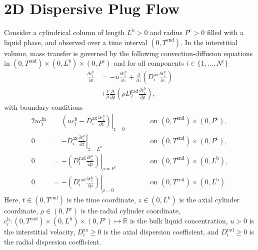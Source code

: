 \documentclass{article}
\begin{document}
\section*{2D Dispersive Plug Flow}
Consider a cylindrical column of length $L^{\mathrm{b}} > 0$ and radius $P^{\mathrm{c}} > 0$ filled with a liquid phase, and observed over a time interval $(0, T^{\mathrm{end}})$.
In the interstitial volume, mass transfer is governed by the following convection-diffusion equations in $(0, T^{\mathrm{end}})\times (0, L^{\mathrm{b}})\times (0, P^{\mathrm{c}})$ and for all components $i\in\{1, \dots, N^{\mathrm{c}} \}$
\begin{align}
    \frac{\partial c^{\mathrm{b}}_{i}}{\partial t}
    &= - u \frac{\partial c^{\mathrm{b}}_{i}}{\partial z}
        + \frac{\partial}{\partial z} \left( D^{\mathrm{ax}}_{i} \frac{\partial c^{\mathrm{b}}_{i}}{\partial z} \right) \nonumber
    \\
    &+ \frac{1}{\rho} \frac{\partial}{\partial \rho} \left( \rho D^{\mathrm{rad}}_{i} \frac{\partial c^{\mathrm{b}}_{i}}{\partial \rho} \right),
\end{align}
with boundary conditions
\begin{alignat}{2}
    u c^{\mathrm{in}}_{i}
    &= \left.\left( u c^{\mathrm{b}}_{i} - D^{\mathrm{ax}}_{i} \frac{\partial c^{\mathrm{b}}_{i}}{\partial z}\right)\right|_{z=0}
    & & \qquad\text{on }(0, T^{\mathrm{end}})\times (0, P^{\mathrm{c}}),
    \\
    0
    &= - D^{\mathrm{ax}}_{i} \left. \frac{\partial c^{\mathrm{b}}_{i}}{\partial z} \right|_{z=L^{\mathrm{b}}}
    & & \qquad\text{on }(0, T^{\mathrm{end}})\times (0, P^{\mathrm{c}}),
    \\
    0
    &= - \left(D^{\mathrm{rad}}_{i} \left. \frac{\partial c^{\mathrm{b}}_{i}}{\partial \rho} \right) \right|_{\rho=P^{\mathrm{c}}}
    & & \qquad\text{on }(0, T^{\mathrm{end}}) \times (0, L^{\mathrm{b}}),
    \\
    0
    &= - \left(D^{\mathrm{rad}}_{i} \left. \frac{\partial c^{\mathrm{b}}_{i}}{\partial \rho} \right) \right|_{\rho=0}
    & & \qquad\text{on }(0, T^{\mathrm{end}}) \times (0, L^{\mathrm{b}}).
\end{alignat}
Here, $t\in (0, T^{\mathrm{end}})$ is the time coordinate, $z\in (0, L^{\mathrm{b}})$ is the axial cylinder coordinate, $\rho\in (0, P^{\mathrm{c}})$ is the radial cylinder coordinate, $c^{\mathrm{b}}_{i}\colon (0, T^{\mathrm{end}})\times (0, L^{\mathrm{b}})\times (0, P^{\mathrm{c}}) \mapsto \mathbb{R}$ is the bulk liquid concentration, $u> 0$ is the interstitial velocity, $D^{\mathrm{ax}}_{i}\geq 0$ is the axial dispersion coefficient, and $D^{\mathrm{rad}}_{i}\geq 0$ is the radial dispersion coefficient.
\end{document}
